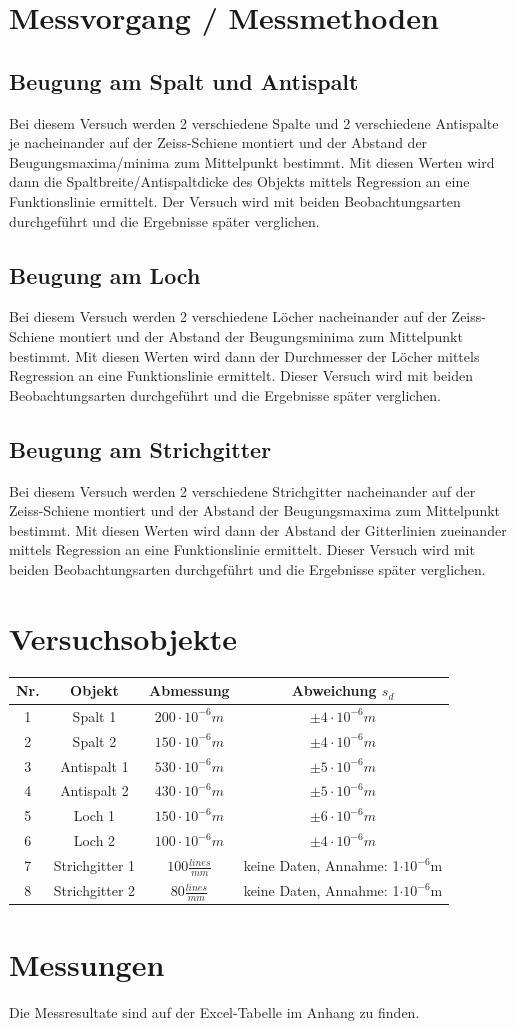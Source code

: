 \section{Messvorgang / Messmethoden}
\subsection{Beugung am Spalt und Antispalt}
Bei diesem Versuch werden 2 verschiedene Spalte und 2 verschiedene Antispalte je nacheinander auf der Zeiss-Schiene montiert und der Abstand der Beugungsmaxima/minima zum Mittelpunkt bestimmt. Mit diesen Werten wird dann die Spaltbreite/Antispaltdicke des Objekts mittels Regression an eine Funktionslinie ermittelt. Der Versuch wird mit beiden Beobachtungsarten durchgeführt und die Ergebnisse später verglichen.
\subsection{Beugung am Loch}
Bei diesem Versuch werden 2 verschiedene Löcher nacheinander auf der Zeiss-Schiene montiert und der Abstand der Beugungsminima zum Mittelpunkt bestimmt. Mit diesen Werten wird dann der Durchmesser der Löcher mittels Regression an eine Funktionslinie ermittelt. Dieser Versuch wird mit beiden Beobachtungsarten durchgeführt und die Ergebnisse später verglichen.
\subsection{Beugung am Strichgitter}
Bei diesem Versuch werden 2 verschiedene Strichgitter nacheinander auf der Zeiss-Schiene montiert und der Abstand der Beugungsmaxima zum Mittelpunkt bestimmt. Mit diesen Werten wird dann der Abstand der Gitterlinien zueinander mittels Regression an eine Funktionslinie ermittelt. Dieser Versuch wird mit beiden Beobachtungsarten durchgeführt und die Ergebnisse später verglichen.
\section{Versuchsobjekte}
\begin{tabular}{cccc}
Nr. & Objekt & Abmessung & Abweichung $s_{d}$ \\ 
\hline 
1 & Spalt 1& $200\cdot10^{-6}m$ & $\pm4\cdot10^{-6}m$\\ 
2 & Spalt 2& $150\cdot10^{-6}m$ & $\pm4\cdot10^{-6}m$ \\ 
3 & Antispalt 1& $530\cdot10^{-6}m$ & $\pm5\cdot10^{-6}m$ \\ 
4 & Antispalt 2& $430\cdot10^{-6}m$ & $\pm5\cdot10^{-6}m$ \\ 
5 & Loch 1& $150\cdot10^{-6}m$ & $\pm6\cdot10^{-6}m$ \\ 
6 & Loch 2& $100\cdot10^{-6}m$ & $\pm4\cdot10^{-6}m$ \\ 
7 & Strichgitter 1& $100\frac{lines}{mm}$ & keine Daten, Annahme: 1$\cdot 10^{-6}$m\\ 
8 & Strichgitter 2& $80\frac{lines}{mm}$ & keine Daten, Annahme: 1$\cdot 10^{-6}$m \\ 
\end{tabular} 
\section{Messungen}
Die Messresultate sind auf der Excel-Tabelle im Anhang zu finden.

